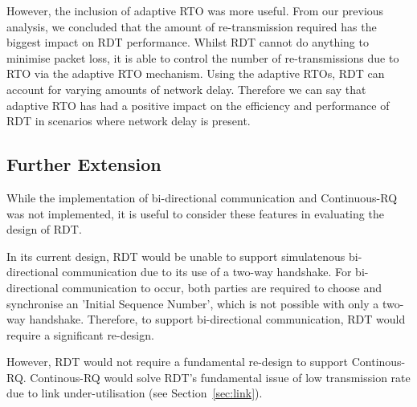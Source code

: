 However, the inclusion of adaptive RTO was more useful. From our previous analysis, we concluded that the amount of re-transmission required has the biggest impact on RDT performance. Whilst RDT cannot do anything to minimise packet loss, it is able to control the number of re-transmissions due to RTO via the adaptive RTO mechanism. Using the adaptive RTOs, RDT can account for varying amounts of network delay. Therefore we can say that adaptive RTO has had a positive impact on the efficiency and performance of RDT in scenarios where network delay is present.

\subsection{Further Extension}

While the implementation of bi-directional communication and Continuous-RQ was not implemented, it is useful to consider these features in evaluating the design of RDT.

In its current design, RDT would be unable to support simulatenous bi-directional communication due to its use of a two-way handshake. For bi-directional communication to occur, both parties are required to choose and synchronise an 'Initial Sequence Number', which is not possible with only a two-way handshake. Therefore, to support bi-directional communication, RDT would require a significant re-design.

However, RDT would not require a fundamental re-design to support Continous-RQ. Continous-RQ would solve RDT's fundamental issue of low transmission rate due to link under-utilisation (see Section~\ref{sec:link}).